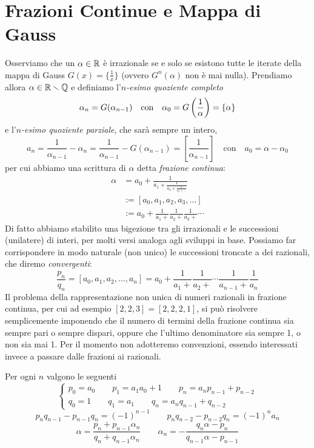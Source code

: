 \section{Frazioni Continue e Mappa di Gauss}

Osserviamo che un $\alpha\in\mathbb{R}$  \`e irrazionale se e solo se esistono tutte le iterate della mappa di Gauss $G(x)=\{\frac{1}{x}\}$ (ovvero $G^n(\alpha)$ non  \`e mai nulla). Prendiamo allora $\alpha\in\mathbb{R}\smallsetminus\mathbb{Q}$ e definiamo l'$n$\emph{-esimo quoziente completo}
\[\alpha_n=G(\alpha_{n-1}) \quad\mbox{con}\quad \alpha_0=G\left(\frac{1}{\alpha}\right)=\left\{\alpha\right\}\]
e l'$n$\emph{-esimo quoziente parziale}, che sar\`a sempre un intero,
\[a_n=\frac{1}{\alpha_{n-1}}-\alpha_n=\frac{1}{\alpha_{n-1}}-G(\alpha_{n-1})=\left[\frac{1}{\alpha_{n-1}}\right] \quad \mbox{con} \quad a_0=\alpha-\alpha_0\]
per cui abbiamo una scrittura di $\alpha$ detta \emph{frazione continua}:
\[\begin{split}
\alpha&=a_0+\frac{1}{a_1+\frac{1}{a_2+\frac{1}{a_3+\dots}}}\\
      &:=[a_0,a_1,a_2,a_3,\dots]\\
      &:=a_0+\frac{1}{a_1+}\frac{1}{a_2+}\frac{1}{a_3+}\cdots
\end{split}\]
Di fatto abbiamo stabilito una bigezione tra gli irrazionali e le successioni (unilatere) di interi, per molti versi analoga agli sviluppi in base. 
Possiamo far corrispondere in modo naturale (non unico) le successioni troncate a dei razionali, che diremo \emph{convergenti}:
\[\frac{p_n}{q_n}=[a_0,a_1,a_2,\dots,a_n]=a_0+\frac{1}{a_1+}\frac{1}{a_2+}\cdots\frac{1}{a_{n-1}+}\frac{1}{a_n}\]
Il problema della rappresentazione non unica di numeri razionali in frazione continua, per cui ad esempio $[2,2,3]=[2,2,2,1]$, 
si pu\`o risolvere semplicemente imponendo che il numero di termini della frazione continua sia sempre pari o sempre dispari, 
oppure che l'ultimo denominatore sia sempre 1, o non sia mai 1. 
Per il momento non adotteremo convenzioni, essendo interessati invece a passare dalle frazioni ai razionali.

\begin{teo} Per ogni $n$ valgono le seguenti
\[\begin{cases}
   p_0=a_0 \qquad p_1=a_1a_0+1 \qquad p_{n}=a_np_{n-1}+p_{n-2}\\
   q_0=1 \qquad q_1=a_1 \qquad q_{n}=a_nq_{n-1}+q_{n-2}
  \end{cases}\]
\[p_nq_{n-1}-p_{n-1}q_n=(-1)^{n-1} \qquad p_nq_{n-2}-p_{n-2}q_n=(-1)^na_n\]
\[\alpha=\frac{p_n+p_{n-1}\alpha_n}{q_n+q_{n-1}\alpha_n} \qquad \alpha_n=-\frac{q_n\alpha-p_n}{q_{n-1}\alpha-p_{n-1}}\]
\end{teo}

